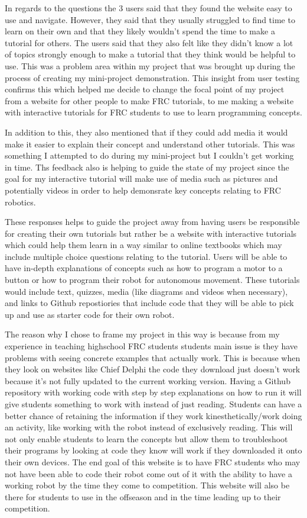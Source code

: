 \documentclass[10pt,twocolumn]{article}
\begin{document}
In regards to the questions the 3 users said that they found the website easy to use and navigate. However, they said that they usually struggled to find time to learn on their own and that they likely wouldn't spend the time to make a tutorial for others. The users said that they also felt like they didn't know a lot of topics strongly enough to make a tutorial that they think would be helpful to use. This was a problem area within my project that was brought up during the process of creating my mini-project demonstration. This insight from user testing confirms this which helped me decide to change the focal point of my project from a website for other people to make FRC tutorials, to me making a website with interactive tutorials for FRC students to use to learn programming concepts. 

In addition to this, they also mentioned that if they could add media it would make it easier to explain their concept and understand other tutorials. This was something I attempted to do during my mini-project but I couldn't get working in time. Ths feedback also is helping to guide the state of my project since the goal for my interactive tutorial will make use of media such as pictures and potentially videos in order to help demonsrate key concepts relating to FRC robotics. 

These responses helps to guide the project away from having users be responsible for creating their own tutorials but rather be a website with interactive tutorials which could help them learn in a way similar to online textbooks which may include multiple choice questions relating to the tutorial. Users will be able to have in-depth explanations of concepts such as how to program a motor to a button or how to program their robot for autonomous movement. These tutorials would include text, quizzes, media (like diagrams and videos when necessary), and links to Github repostiories that include code that they will be able to pick up and use as starter code for their own robot. 

The reason why I chose to frame my project in this way is because from my experience in teaching highschool FRC students students main issue is they have problems with seeing concrete examples that actually work. This is because when they look on websites like Chief Delphi the code they download just doesn't work because it's not fully updated to the current working version. Having a Github repository with working code with step by step explanations on how to run it will give students something to work with instead of just reading. Students can have a better chance of retaining the information if they work kinesthetically/work doing an activity, like working with the robot instead of exclusively reading\cite{oladele_kinesthetic_nodate}. This will not only enable students to learn the concepts but allow them to troubleshoot their programs by looking at code they know will work if they downloaded it onto their own devices. The end goal of this website is to have FRC students who may not have been able to code their robot come out of it with the ability to have a working robot by the time they come to competition. This website will also be there for students to use in the offseason and in the time leading up to their competition.
\end{document}
